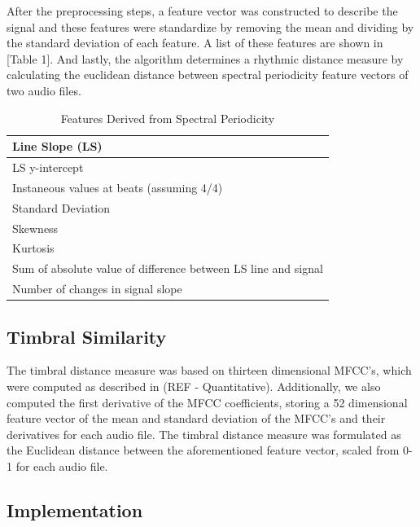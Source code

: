 \documentclass{article}
\begin{document}
After the preprocessing steps, a feature vector was constructed to describe the signal and these features were standardize by removing the mean and dividing by the standard deviation of each feature. A list of these features are shown in [Table 1]. And lastly, the algorithm determines a rhythmic distance measure by calculating the euclidean distance between spectral periodicity feature vectors of two audio files.

\begin{table}[h!]
  \begin{center}
    \begin{tabular}{| p{7.0cm} |}
    \hline
    Line Slope (LS) \\
    \hline
	LS y-intercept\\
	    \hline

	Instaneous values at beats (assuming 4/4) \\
	    \hline

	Standard Deviation \\
	    \hline
	Skewness \\
	    \hline
	Kurtosis \\
	    \hline
	Sum of absolute value of difference between LS line and signal \\
	    \hline
	Number of changes in signal slope \\    \hline
    \end{tabular}
  \end{center}
  \caption{Features Derived from Spectral Periodicity}
\end{table}
    

\subsection{Timbral Similarity}

The timbral distance measure was based on thirteen dimensional MFCC’s, which were computed as described in (REF - Quantitative). Additionally, we also computed the first derivative of the MFCC coefficients, storing a 52 dimensional feature vector of the mean and standard deviation of the MFCC’s and their derivatives for each audio file. The timbral distance measure was formulated as the Euclidean distance between the aforementioned feature vector, scaled from 0-1 for each audio file.

\subsection{Implementation}
\end{document}

